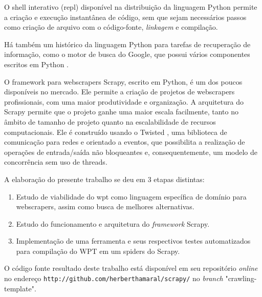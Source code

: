O shell interativo (\gls{repl}) disponível na distribuição da linguagem Python permite a criação e execução instantânea de código, sem que sejam necessários passos como criação de arquivo com o código-fonte, \emph{linkagem} e compilação.

Há também um histórico da linguagem Python para tarefas de recuperação de informação, como o motor de busca do Google, que possui vários componentes escritos em Python \cite{google}.

O framework para \glspl{webscraper} Scrapy, escrito em Python, é um dos poucos disponíveis no mercado. Ele permite a criação de projetos de \glspl{webscraper} profissionais, com uma maior produtividade e organização. A arquitetura do Scrapy permite que o projeto ganhe uma maior escala facilmente, tanto no âmbito de tamanho de projeto quanto na escalabilidade de recursos computacionais. Ele é construído usando o Twisted \cite{twisted}, uma biblioteca de comunicação para redes e orientado a eventos, que possibilita a realização de operações de entrada/saída não bloqueantes e, consequentemente, um modelo de concorrência sem uso de threads. 

A elaboração do presente trabalho se deu em 3 etapas distintas:

\begin{enumerate}
	\item Estudo de viabilidade do \gls{wpt} como linguagem específica de domínio para \glspl{webscraper}, assim como busca de melhores alternativas.
	\item Estudo do funcionamento e arquitetura do \emph{framework} Scrapy.
	\item Implementação de uma ferramenta e seus respectivos testes automatizados para compilação do WPT em um \glspl{spider} do Scrapy.
\end{enumerate}

O código fonte resultado deste trabalho está disponível em seu repositório \emph{online} no endereço  \texttt{http://github.com/herberthamaral/scrapy/} no \emph{branch} "crawling-template".